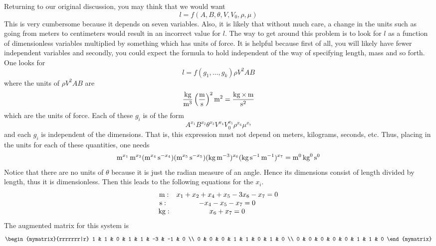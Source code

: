 Returning to our original discussion, you may think that we would want
\begin{equation*}
l=f(A,B,\theta ,V,V_{0},\rho ,\mu)
\end{equation*}
This is very cumbersome because it depends on seven variables. Also,
it is likely that without much care, a change in the units such as
going from meters to centimeters would result in an incorrect value
for $l$. The way to get around this problem is to look for $l $ as a
function of dimensionless variables multiplied by something which has
units of force. It is helpful because first of all, you will likely
have fewer independent variables and secondly, you could expect the
formula to hold independent of the way of specifying length, mass and
so forth. One looks for
\begin{equation*}
l=f(g_{1},\ldots,g_{k}) \rho V^2AB
\end{equation*}
where the units of $\rho V^2AB$ are
\begin{equation*}
\frac{\kg}{\m^3}\paren{\frac{\m}{\s }}^2\m^2=\frac{\kg\times \m}{%
\s^2}
\end{equation*}
which are the units of force. Each of these $g_{i}$ is of the form
\begin{equation}
A^{x_{1}}B^{x_{2}}\theta^{x_{3}}V^{x_{4}}V_{0}^{x_{5}}\rho^{x_{6}}\mu
^{x_{7}}  \label{11-july-e1f}
\end{equation}
and each $g_{i}$ is independent of the dimensions. That is, this expression
must not depend on meters, kilograms, seconds, etc. Thus, placing in the
units for each of these quantities, one needs
\begin{equation*}
\mathop{\textrm{\rm m}}\nolimits^{x_{1}}\mathop{\textrm{\rm m}}\nolimits^{x_{2}}(\mathop{\textrm{\rm m}}\nolimits^{x_{4}}\mathop{\textrm{\rm s}}\nolimits^{-x_{4}}) (\mathop{\textrm{\rm m}}\nolimits^{x_{5}}\mathop{\textrm{\rm s}}\nolimits
^{-x_{5}}) (\mathop{\textrm{\rm kg}}\nolimits\mathop{\textrm{\rm m}}\nolimits^{-3})^{x_{6}}(\mathop{\textrm{\rm kg}}\nolimits\mathop{\textrm{\rm s}}\nolimits
^{-1}\mathop{\textrm{\rm m}}\nolimits^{-1})^{x_{7}}=\mathop{\textrm{\rm m}}\nolimits^0\mathop{\textrm{\rm kg}}\nolimits^0\mathop{\textrm{\rm s}}\nolimits^0
\end{equation*}
Notice that there are no units of $\theta$ because it is just the radian
measure of an angle. Hence its dimensions consist of length divided by
length, thus it is dimensionless. Then this leads to the following equations
for the $x_{i}$.
\begin{equation*}
\begin{array}{cc}
\m: & x_{1}+x_{2}+x_{4}+x_{5}-3x_{6}-x_{7}=0 \\
\s :\  & -x_{4}-x_{5}-x_{7}=0 \\
\kg: & x_{6}+x_{7}=0%
\end{array}
\end{equation*}
The augmented matrix for this system is
\begin{equation*}
\begin{mymatrix}{rrrrrrr|r}
1 & 1 & 0 & 1 & 1 & -3 & -1 & 0 \\
0 & 0 & 0 & 1 & 1 & 0 & 1 & 0 \\
0 & 0 & 0 & 0 & 0 & 1 & 1 & 0
\end{mymatrix}
\end{equation*}
